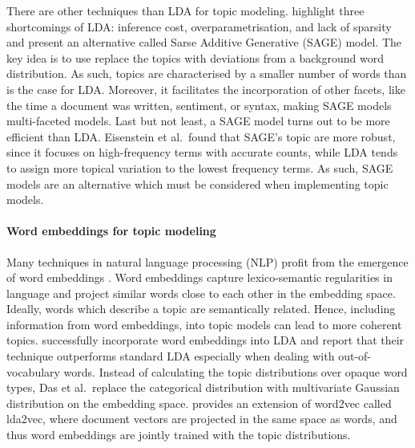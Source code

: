 There are other techniques than LDA for topic modeling. \citet{EisensteinAX11} highlight three shortcomings of LDA: inference cost, overparametrisation, and lack of sparsity and present an alternative called Sarse Additive Generative (SAGE) model. The key idea is to use  replace the topics with deviations from a background word distribution. As such, topics are characterised by a smaller number of words than is the case for LDA. Moreover, it facilitates the incorporation of other facets, like the time a document was written, sentiment, or syntax, making SAGE models multi-faceted models. Last but not least, a SAGE model turns out to be more efficient than LDA. Eisenstein et al.~found that SAGE's topic are more robust, since it focuses on high-frequency terms with accurate counts, while LDA tends to assign more topical variation to the lowest frequency terms. As such, SAGE models are an alternative which must be considered when implementing topic models.

\paragraph{Word embeddings for topic modeling} Many techniques in natural language processing (NLP) profit from the emergence of word embeddings \citep{mikolovdistributed2013,bengioneural2003}. Word embeddings capture lexico-semantic regularities in language and project similar words close to each other in the embedding space. Ideally, words which describe a topic are semantically related. Hence, including information from word embeddings, into topic models can lead to more coherent topics. \citet{dasgaussian2015} successfully incorporate word embeddings into LDA and report that their technique outperforms standard LDA especially when dealing with out-of-vocabulary words. Instead of calculating the topic distributions over opaque word types, Das et al.~replace the categorical distribution with multivariate Gaussian distribution on the embedding space. \citet{Moody16} provides an extension of word2vec called lda2vec, where document vectors are projected in the same space as words, and thus word embeddings are jointly trained with the topic distributions.

